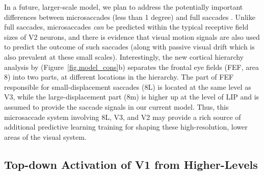 \documentclass[11pt,twoside]{article}
\newif\myifpdf
\begin{document}
In a future, larger-scale model, we plan to address the potentially important differences between microsaccades (less than 1 degree) and full saccades \cite{Martinez-CondeOtero-MillanMacknik13,Martinez-CondeMacknikHubel04}.  Unlike full saccades, microsaccades {\em can} be predicted within the typical receptive field sizes of V2 neurons, and there is evidence that visual motion signals are also used to predict the outcome of such saccades (along with passive visual drift which is also prevalent at these small scales).  Interestingly, the new cortical hierarchy analysis by  (Figure~\ref{fig.model_cons}b) separates the frontal eye fields (FEF, area 8) into two parts, at different locations in the hierarchy.  The part of FEF responsible for small-displacement saccades (8L) is located at the same level as V3, while the large-displacement part (8m) is higher up at the level of LIP and is assumed to provide the saccade signals in our current model.  Thus, this microsaccade system involving 8L, V3, and V2 may provide a rich source of additional predictive learning training for shaping these high-resolution, lower areas of the visual system.

\subsection{Top-down Activation of V1 from Higher-Levels}
\end{document}
